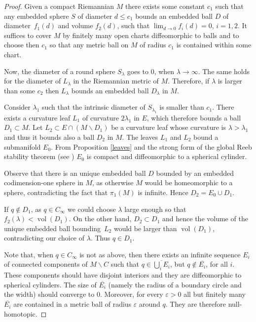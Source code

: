 \documentclass[JEP,XML,SOM,Unicode]{cedram}
\let\moins\smallsetminus
\DeclareMathOperator{\vol}{vol}
\theoremstyle{definition}
\theoremstyle{remark}
\numberwithin{equation}{section}
\begin{document}
\begin{proof}
Given a compact Riemannian
$M$ there exists some constant $c_1$ such that
any embedded sphere $S$ of diameter $d\leq c_1$ bounds an embedded ball $D$ of
diameter~$f_1(d)$ and volume $f_2(d)$, such that $\lim_{d\to 0}f_i(d)=0$, $i=1,2$.
It suffices to cover $M$ by finitely many open charts
diffeomorphic to balls and to choose then $c_1$ so that any metric ball on $M$
of radius $c_1$ is contained within some chart.

Now, the diameter of a round sphere $S_{\lambda}$ goes to $0$,
when $\lambda\to \infty$. The same holds for the diameter of $L_{\lambda}$
in the Riemannian metric of $M$.
Therefore, if $\lambda$ is larger than some $c_2$ then $L_{\lambda}$
bounds an embedded ball $D_{\lambda}$ in $M$.

Consider $\lambda_{1}$ such that the intrinsic diameter of $S_{\lambda_{1}}$ is smaller than $c_1$.
There exists a curvature leaf $L_1$ of curvature $2\lambda_{1}$ in $E$, which therefore bounds a
ball $D_1\subset M$.
Let $L_2\subset E\cap (M\moins D_1)$ be a curvature leaf whose
curvature is $\lambda >\lambda_{1}$ and thus it bounds
also a ball $D_2$ in $M$. The leaves $L_1$ and $L_2$ bound a
submanifold $E_0$. From Proposition \ref{leaves} and the strong form of the global Reeb stability theorem
(see \cite{Mil,EMS}) $E_0$ is compact and diffeomorphic to a spherical cylinder.

Observe that there is an unique embedded ball $D$ bounded by an
embedded codimension-one sphere in $M$, as otherwise
$M$ would be homeomorphic to a sphere, contradicting the fact that
$\pi_1(M)$ is infinite. Hence $D_2=E_0\cup D_1$.

If $q\not\in D_1$, as $q\in C_{\infty}$ we could choose $\lambda$
large enough so that $f_2(\lambda) < \vol(D_1)$.
On the other hand, $D_2\subset D_1$ and hence the volume of the unique
embedded ball bounding~$L_2$ would be larger than $ \vol(D_1)$,
contradicting our choice of $\lambda$.
Thus $q\in D_1$.

Note that, when $q\in C_{\infty}$ is not as above, then there exists an infinite sequence $E_i$ of connected components of $M\moins C$ such that
$q\in \overline{\bigcup_i E_i}$, but $q\not\in \overline{E_i}$, for all $i$.
These components should have disjoint interiors and they are diffeomorphic to spherical cylinders.
The size of $\overline{E_i}$ (namely the radius of a boundary circle and the width)
should converge to $0$. Moreover, for every $\varepsilon >0$ all but finitely many $\overline{E_i}$
are contained in a metric ball of radius $\varepsilon$ around $q$. They are therefore null-homotopic.
\end{proof}
\end{document}
